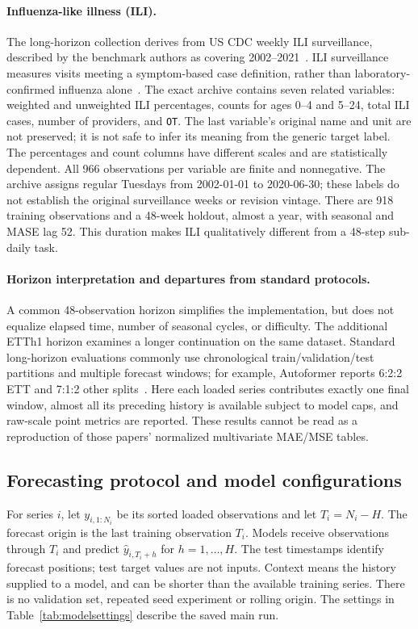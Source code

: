 \paragraph{Influenza-like illness (ILI).}
The long-horizon collection derives from US CDC weekly ILI surveillance, described by the benchmark authors as covering 2002--2021~\cite{autoformer_paper}. ILI surveillance measures visits meeting a symptom-based case definition, rather than laboratory-confirmed influenza alone~\cite{cdc_ili}. The exact archive contains seven related variables: weighted and unweighted ILI percentages, counts for ages 0--4 and 5--24, total ILI cases, number of providers, and \texttt{OT}. The last variable's original name and unit are not preserved; it is not safe to infer its meaning from the generic target label. The percentages and count columns have different scales and are statistically dependent. All 966 observations per variable are finite and nonnegative. The archive assigns regular Tuesdays from 2002-01-01 to 2020-06-30; these labels do not establish the original surveillance weeks or revision vintage. There are 918 training observations and a 48-week holdout, almost a year, with seasonal and MASE lag 52. This duration makes ILI qualitatively different from a 48-step sub-daily task.

\paragraph{Horizon interpretation and departures from standard protocols.}
A common 48-observation horizon simplifies the implementation, but does not equalize elapsed time, number of seasonal cycles, or difficulty. The additional ETTh1 horizon examines a longer continuation on the same dataset. Standard long-horizon evaluations commonly use chronological train/validation/test partitions and multiple forecast windows; for example, Autoformer reports 6:2:2 ETT and 7:1:2 other splits~\cite{autoformer_paper}. Here each loaded series contributes exactly one final window, almost all its preceding history is available subject to model caps, and raw-scale point metrics are reported. These results cannot be read as a reproduction of those papers' normalized multivariate MAE/MSE tables.

\subsection{Forecasting protocol and model configurations}\label{sec:protocol}
For series $i$, let $y_{i,1:N_i}$ be its sorted loaded observations and let $T_i=N_i-H$. The forecast origin is the last training observation $T_i$. Models receive observations through $T_i$ and predict $\hat y_{i,T_i+h}$ for $h=1,\ldots,H$. The test timestamps identify forecast positions; test target values are not inputs. Context means the history supplied to a model, and can be shorter than the available training series. There is no validation set, repeated seed experiment or rolling origin. The settings in Table~\ref{tab:modelsettings} describe the saved main run.

